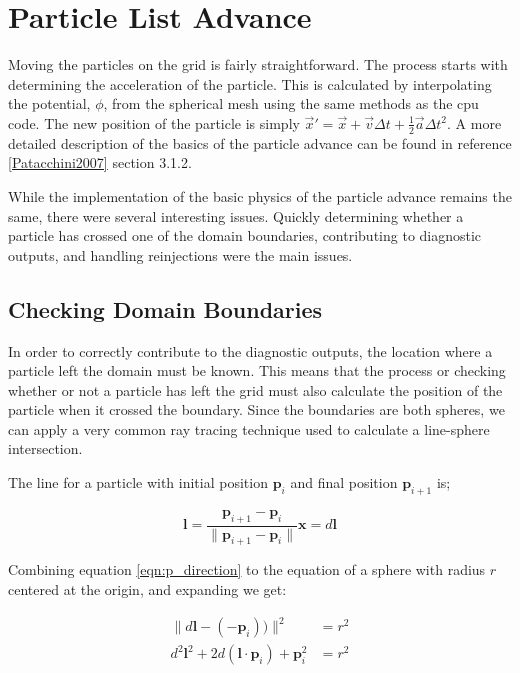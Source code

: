  
	\section{Particle List Advance}
	
Moving the particles on the grid is fairly straightforward. The process starts with determining the acceleration of the particle. This is calculated by interpolating the potential, $\phi$, from the spherical mesh using the same methods as the cpu code. The new position of the particle is simply $\vec{x}' = \vec{x}+\vec{v}\Delta t+\frac{1}{2}\vec{a}\Delta t^2$. A more detailed description of the basics of the particle advance can be found in reference \ref{Patacchini2007} section 3.1.2.
		
While the implementation of the basic physics of the particle advance remains the same, there were several interesting issues. Quickly determining whether a particle has crossed one of the domain boundaries, contributing to diagnostic outputs, and handling reinjections were the main issues. 

		\subsection{Checking Domain Boundaries}
In order to correctly contribute to the diagnostic outputs, the location where a particle left the domain must be known. This means that the process or checking whether or not a particle has left the grid must also calculate the position of the particle when it crossed the boundary. Since the boundaries are both spheres, we can apply a very common ray tracing technique used to calculate a line-sphere intersection. 

The line for a particle with initial position $\mathbf{p}_i$ and final position $\mathbf{p}_{i+1}$ is;

\begin{equation}
 \mathbf{l} = \frac{\mathbf{p}_{i+1} - \mathbf{p}_{i}}{\|\mathbf{p}_{i+1} - \mathbf{p}_{i}\|}
\mathbf{x} = d\mathbf{l}
\label{eqn:p_direction}
\end{equation}

Combining equation \ref{eqn:p_direction} to the equation of a sphere with radius $r$ centered at the origin, and expanding we get:

\begin{equation}
\begin{aligned}
\|d\mathbf{l} - (-\mathbf{p}_i)) \|^2  &= r^2 \\
d^2\mathbf{l}^2 + 2d(\mathbf{l}\cdot \mathbf{p}_i) + \mathbf{p}_i^2 &= r^2
		\end{aligned}
\end{equation}

